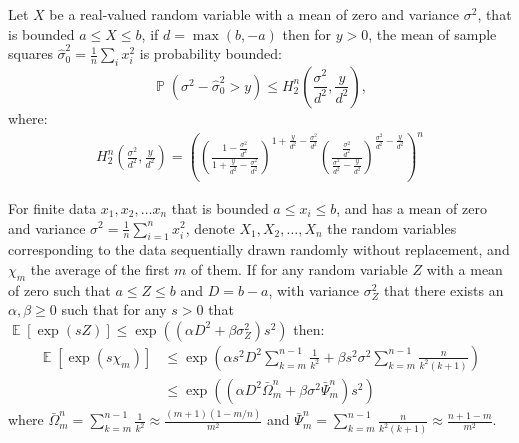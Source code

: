 \documentclass[
10pt, %
a4paper, %
oneside, %
headinclude,footinclude, %
BCOR5mm, %
]{scrartcl}
\DeclareMathOperator{\E}{\mathbb{E}}
\DeclareMathOperator{\p}{\mathbb{P}}
\begin{document}
\begin{theorem}\label{sample_squares}
Let $X$ be a real-valued random variable with a mean of zero and variance $\sigma^2$, that is bounded $a\le X\le b$, if $d=\max(b,-a)$ then for $y>0$, the mean of sample squares $\hat{\sigma}_0^2=\frac{1}{n}\sum_ix_i^2$ is probability bounded:
\begin{equation}\label{equation_squares}\p(\sigma^2 - \hat{\sigma}_0^2> y) \le H_2^n\left(\frac{\sigma^2}{d^2},\frac{y}{d^2}\right),
\end{equation}
where:
\begin{align} H_2^n\left(\frac{\sigma^2}{d^2},\frac{y}{d^2}\right) = \left(
\left(\frac{1-\frac{\sigma^2}{d^2}}{1+\frac{y}{d^2}-\frac{\sigma^2}{d^2}}\right)^{1+\frac{y}{d^2}-\frac{\sigma^2}{d^2}}
\left(\frac{\frac{\sigma^2}{d^2}}{\frac{\sigma^2}{d^2}-\frac{y}{d^2}}\right)^{\frac{\sigma^2}{d^2}-\frac{y}{d^2}}
\right)^n
\end{align}
\end{theorem}



\begin{theorem}\label{martingale0}
For finite data $x_1,x_2,\dots x_n$ that is bounded $a\le x_i\le b$, and has a mean of zero and variance $\sigma^2=\frac{1}{n}\sum_{i=1}^nx_i^2$, denote $X_1,X_2,\dots,X_n$ the random variables corresponding to the data sequentially drawn randomly without replacement, and $\chi_m$ the average of the first $m$ of them.
If for any random variable $Z$ with a mean of zero such that $a\le Z\le b$ and $D=b-a$, with variance $\sigma_Z^2$ that there exists an $\alpha, \beta \ge 0$ such that for any $s>0$ that $\E[\exp(sZ)]\le\exp((\alpha D^2 +\beta \sigma_Z^2) s^2)$ then:
\begin{align}\E[\exp(s\chi_m)]&\le\exp\left(\alpha s^2D^2\sum_{k=m}^{n-1}\frac{1}{k^2} +\beta s^2\sigma^2 \sum_{k=m}^{n-1}\frac{n}{k^2(k+1)}\right)\\ &\le \exp((\alpha D^2\bar{\Omega}_m^n +\beta\sigma^2 \bar{\Psi}_m^n)s^2)\end{align}
where $\bar{\Omega}_m^n = \sum_{k=m}^{n-1}\frac{1}{k^2}\approx \frac{(m+1)(1-m/n)}{m^2}$ and $\bar{\Psi}_m^n = \sum_{k=m}^{n-1}\frac{n}{k^2(k+1)}\approx \frac{n+1-m}{m^2}$.
\end{theorem}
\end{document}
